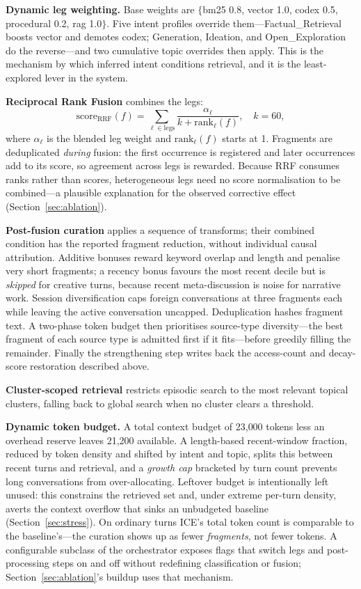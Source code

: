 \documentclass[twoside,11pt]{article}
\begin{document}
\textbf{Dynamic leg weighting.} Base weights are $\{$bm25 0.8, vector 1.0, codex 0.5, procedural 0.2, rag 1.0$\}$. Five intent profiles override them---Factual\_Retrieval boosts vector and demotes codex; Generation, Ideation, and Open\_Exploration do the reverse---and two cumulative topic overrides then apply. This is the mechanism by which inferred intent conditions retrieval, and it is the least-explored lever in the system.

\textbf{Reciprocal Rank Fusion} combines the legs:
\begin{equation}
\mathrm{score}_{\mathrm{RRF}}(f) = \sum_{\ell \in \mathrm{legs}} \frac{\alpha_\ell}{k + \mathrm{rank}_\ell(f)}, \quad k = 60,
\end{equation}
where $\alpha_\ell$ is the blended leg weight and $\mathrm{rank}_\ell(f)$ starts at 1. Fragments are deduplicated \emph{during} fusion: the first occurrence is registered and later occurrences add to its score, so agreement across legs is rewarded. Because RRF consumes ranks rather than scores, heterogeneous legs need no score normalisation to be combined---a plausible explanation for the observed corrective effect (Section~\ref{sec:ablation}).

\textbf{Post-fusion curation} applies a sequence of transforms; their combined condition has the reported fragment reduction, without individual causal attribution. Additive bonuses reward keyword overlap and length and penalise very short fragments; a recency bonus favours the most recent decile but is \emph{skipped} for creative turns, because recent meta-discussion is noise for narrative work. Session diversification caps foreign conversations at three fragments each while leaving the active conversation uncapped. Deduplication hashes fragment text. A two-phase token budget then prioritises source-type diversity---the best fragment of each source type is admitted first if it fits---before greedily filling the remainder. Finally the strengthening step writes back the access-count and decay-score restoration described above.

\textbf{Cluster-scoped retrieval} restricts episodic search to the most relevant topical clusters, falling back to global search when no cluster clears a threshold.

\textbf{Dynamic token budget.} A total context budget of 23{,}000 tokens less an overhead reserve leaves 21{,}200 available. A length-based recent-window fraction, reduced by token density and shifted by intent and topic, splits this between recent turns and retrieval, and a \emph{growth cap} bracketed by turn count prevents long conversations from over-allocating. Leftover budget is intentionally left unused: this constrains the retrieved set and, under extreme per-turn density, averts the context overflow that sinks an unbudgeted baseline (Section~\ref{sec:stress}). On ordinary turns ICE's total token count is comparable to the baseline's---the curation shows up as fewer \emph{fragments}, not fewer tokens. A configurable subclass of the orchestrator exposes flags that switch legs and post-processing steps on and off without redefining classification or fusion; Section~\ref{sec:ablation}'s buildup uses that mechanism.
\end{document}
